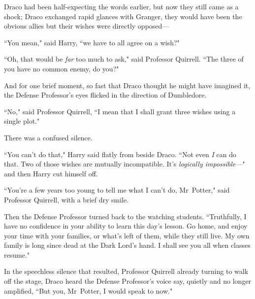 Draco had been half-expecting the words earlier, but now they still came as a shock; Draco exchanged rapid glances with Granger, they would have been the obvious allies but their wishes were directly opposed—

``You mean," said Harry, ``we have to all agree on a wish?"

``Oh, that would be \emph{far} too much to ask," said Professor Quirrell. ``The three of you have no common enemy, do you?"

And for one brief moment, so fast that Draco thought he might have imagined it, the Defense Professor's eyes flicked in the direction of Dumbledore.

``No," said Professor Quirrell, ``I mean that I shall grant three wishes using a single plot."

There was a confused silence.

``You can't do that," Harry said flatly from beside Draco. ``Not even \emph{I} can do that. Two of those wishes are mutually incompatible. It's \emph{logically impossible—}" and then Harry cut himself off.

``You're a few years too young to tell me what I can't do, Mr~Potter," said Professor Quirrell, with a brief dry smile.

Then the Defense Professor turned back to the watching students. ``Truthfully, I have no confidence in your ability to learn this day's lesson. Go home, and enjoy your time with your families, or what's left of them, while they still live. My own family is long since dead at the Dark Lord's hand. I shall see you all when classes resume."

In the speechless silence that resulted, Professor Quirrell already turning to walk off the stage, Draco heard the Defense Professor's voice say, quietly and no longer amplified, ``But you, Mr~Potter, I would speak to now."

